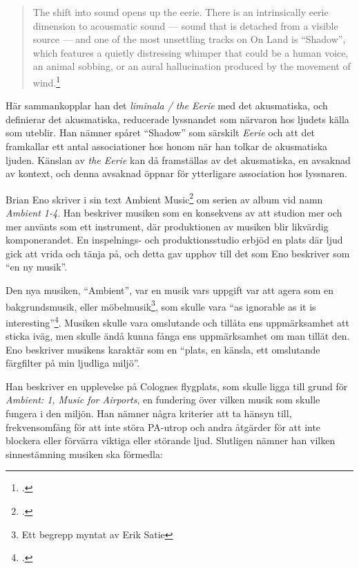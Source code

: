 \documentclass{article}
\begin{document}
\begin{quote}
The shift into sound opens up the eerie. There is an intrinsically eerie dimension to acousmatic sound — sound
that is detached from a visible source — and one of the most unsettling tracks on On Land is ``Shadow'', which
features a quietly distressing whimper that could be a human voice, an animal sobbing, or an aural
hallucination produced by the movement of wind.\footcite[81]{Fisher}
\end{quote}

Här sammankopplar han det \emph{liminala / the Eerie} med det akusmatiska, och definierar det akusmatiska,
reducerade lyssnandet som närvaron hos ljudets källa som uteblir. Han nämner spåret ``Shadow'' som särskilt
\emph{Eerie} och att det framkallar ett antal associationer hos honom när han tolkar de akusmatiska ljuden.
Känslan av \emph{the Eerie} kan då framställas av det akusmatiska, en avsaknad av kontext, och denna avsaknad
öppnar för ytterligare association hos lyssnaren.

Brian Eno skriver i sin text Ambient Music\footcite[149-153]{Eno} om serien av album vid namn \emph{Ambient
1-4}. Han beskriver musiken som en konsekvens av att studion mer och mer använts som ett instrument, där
produktionen av musiken blir likvärdig komponerandet. En inspelnings- och produktionsstudio erbjöd en plats
där ljud gick att vrida och tänja på, och detta gav upphov till det som Eno beskriver som ``en ny musik''.

Den nya musiken, ``Ambient'', var en musik vars uppgift var att agera som en bakgrundsmusik, eller
möbelmusik\footnote{Ett begrepp myntat av Erik Satie}, som skulle vara ``as ignorable as it is
interesting''\footcite{Airports}. Musiken skulle vara omslutande och tillåta ens uppmärksamhet att sticka
iväg, men skulle ändå kunna fånga ens uppmärksamhet om man tillät den. Eno beskriver musikens karaktär som en
``plats, en känsla, ett omslutande färgfilter på min ljudliga miljö''.

Han beskriver en upplevelse på Colognes flygplats, som skulle ligga till grund för \emph{Ambient: 1, Music for
Airports}, en fundering över vilken musik som skulle fungera i den miljön. Han nämner några kriterier att ta
hänsyn till, frekvensomfång för att inte störa PA-utrop och andra åtgärder för att inte blockera eller
förvärra viktiga eller störande ljud. Slutligen nämner han vilken sinnestämning musiken ska förmedla:
\end{document}
